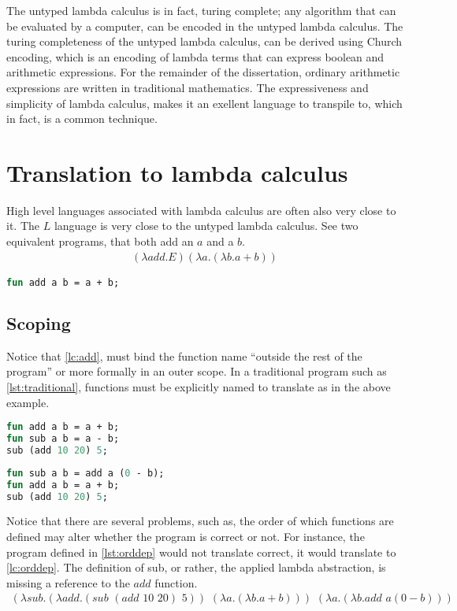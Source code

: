 \documentclass[11pt,oneside,a4paper]{report}
\begin{document}
The untyped lambda calculus is in fact, turing complete; any algorithm that can be evaluated by a computer, can be encoded in the untyped lambda calculus.
The turing completeness of the untyped lambda calculus, can be derived using Church encoding, which is an encoding of lambda terms that can express boolean and arithmetic expressions\cite{church1985calculi}.
For the remainder of the dissertation, ordinary arithmetic expressions are written in traditional mathematics.
The expressiveness and simplicity of lambda calculus, makes it an exellent language to transpile to, which in fact, is a common technique.

\section{Translation to lambda calculus}
High level languages associated with lambda calculus are often also very close to it.
The $L$ language is very close to the untyped lambda calculus.
See two equivalent programs, that both add an $a$ and a $b$.
\begin{align}
(\lambda add . E)(\lambda a . (\lambda b . a + b))
\label{lc:add}
\end{align}
\begin{lstlisting}[language=ML,caption={Add function},xleftmargin=.35\textwidth]
fun add a b = a + b;
\end{lstlisting}

\subsection{Scoping}
Notice that \autoref{lc:add}, must bind the function name ``outside the rest of the program'' or more formally in an outer scope.
In a traditional program such as \autoref{lst:traditional}, functions must be explicitly named to translate as in the above example.
\begin{lstlisting}[language=ML,caption={A traditional program},label={lst:traditional},xleftmargin=.32\textwidth]
fun add a b = a + b;
fun sub a b = a - b;
sub (add 10 20) 5;
\end{lstlisting}
\begin{lstlisting}[language=ML,caption={An order dependant program},label={lst:orddep},xleftmargin=.32\textwidth]
fun sub a b = add a (0 - b);
fun add a b = a + b;
sub (add 10 20) 5;
\end{lstlisting}
Notice that there are several problems, such as, the order of which functions are defined may alter whether the program is correct or not.
For instance, the program defined in \autoref{lst:orddep} would not translate correct, it would translate to \autoref{lc:orddep}.
The definition of sub, or rather, the applied lambda abstraction, is missing a reference to the $add$ function.
\begin{align}
(\lambda sub . (\lambda add . (sub \,\, (add \,\, 10 \,\, 20) \,\, 5)) \,\, (\lambda a . (\lambda b . a + b))) \,\, (\lambda a . (\lambda b . add \,\, a (0 - b)))
\label{lc:orddep}
\end{align}
\end{document}
